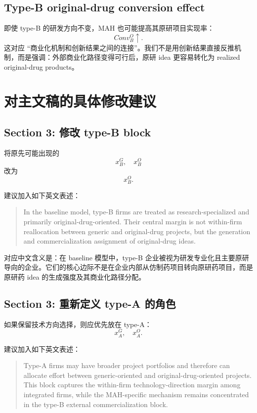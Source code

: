 \documentclass[12pt]{article}
\begin{document}
\subsection{Type-B original-drug conversion effect}

即使 type-B 的研发方向不变，MAH 也可能提高其原研项目实现率：
\[
Conv_B^O\uparrow.
\]
这对应 ``商业化机制和创新结果之间的连接''。我们不是用创新结果直接反推机制，而是强调：外部商业化路径变得可行后，原研 idea 更容易转化为 realized original-drug products。

\section{对主文稿的具体修改建议}

\subsection{Section 3: 修改 type-B block}

将原先可能出现的
\[
x_B^G,\quad x_B^O
\]
改为
\[
x_B^O.
\]

建议加入如下英文表述：
\begin{quote}
In the baseline model, type-B firms are treated as research-specialized and primarily original-drug-oriented. Their central margin is not within-firm reallocation between generic and original-drug projects, but the generation and commercialization assignment of original-drug ideas.
\end{quote}

对应中文含义是：在 baseline 模型中，type-B 企业被视为研发专业化且主要原研导向的企业。它们的核心边际不是在企业内部从仿制药项目转向原研药项目，而是原研药 idea 的生成强度及其商业化路径分配。

\subsection{Section 3: 重新定义 type-A 的角色}

如果保留技术方向选择，则应优先放在 type-A：
\[
x_A^G,\quad x_A^O.
\]

建议加入如下英文表述：
\begin{quote}
Type-A firms may have broader project portfolios and therefore can allocate effort between generic-oriented and original-drug-oriented projects. This block captures the within-firm technology-direction margin among integrated firms, while the MAH-specific mechanism remains concentrated in the type-B external commercialization block.
\end{quote}
\end{document}
